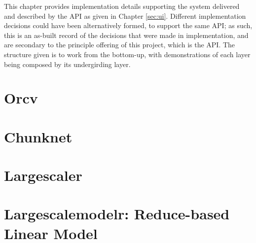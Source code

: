 This chapter provides implementation details supporting the system delivered and described by the API as given in Chapter \ref{sec:ui}.
Different implementation decisions could have been alternatively formed, to support the same API; as such, this is an as-built record of the decisions that were made in implementation, and are secondary to the principle offering of this project, which is the API.
The structure given is to work from the bottom-up, with demonstrations of each layer being composed by its undergirding layer.

\section{Orcv}

\section{Chunknet}

\section{Largescaler}

\section{Largescalemodelr: Reduce-based Linear Model}

